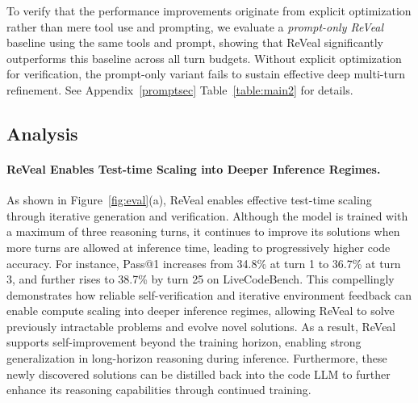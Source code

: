 \documentclass{article} %
\begin{document}
To verify that the performance improvements originate from explicit optimization rather than mere tool use and prompting, we evaluate a \emph{prompt-only ReVeal} baseline using the same tools and prompt, showing that ReVeal significantly outperforms this baseline across all turn budgets. Without explicit optimization for verification, the prompt-only variant fails to sustain effective deep multi-turn refinement. See Appendix~\ref{promptsec} Table~\ref{table:main2} for details.


\subsection{Analysis}
\label{sec:analysis}
\paragraph{ReVeal Enables Test-time Scaling into Deeper Inference Regimes.}
As shown in Figure~\ref{fig:eval}(a), ReVeal enables effective test-time scaling through iterative generation and verification. Although the model is trained with a maximum of three reasoning turns, it continues to improve its solutions when more turns are allowed at inference time, leading to progressively higher code accuracy. For instance, Pass@1 increases from 34.8\% at turn 1 to 36.7\% at turn 3, and further rises to 38.7\% by turn 25 on LiveCodeBench. 
This compellingly demonstrates how reliable self-verification and iterative environment feedback can enable compute scaling into deeper inference regimes, allowing ReVeal to solve previously intractable problems and evolve novel solutions. 
As a result, ReVeal supports self-improvement beyond the training horizon, enabling strong generalization in long-horizon reasoning during inference. Furthermore, these newly discovered solutions can be distilled back into the code LLM to further enhance its reasoning capabilities through continued training.
\end{document}
